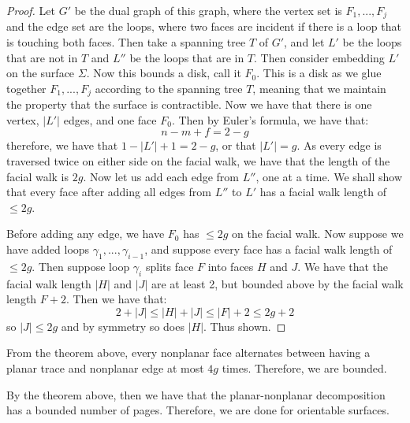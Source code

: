 \begin{proof}
	Let $G'$ be the dual graph of this graph, where the vertex set is $F_1, ..., F_j$ and the edge set are the loops, where two faces are incident if there is a loop that is touching both faces. Then take a spanning tree $T$ of $G'$, and let $L'$ be the loops that are not in $T$ and $L''$ be the loops that are in $T$. 
	Then consider embedding $L'$ on the surface $\Sigma$. Now this bounds a disk, call it $F_0$. This is a disk as we glue together $F_1, ..., F_j$ according to the spanning tree $T$, meaning that we maintain the property that the surface is contractible.
	Now we have that there is one vertex, $|L'|$ edges, and one face $F_0$. Then by Euler's formula, we have that:
	\begin{equation}
		n - m + f = 2 - g
	\end{equation}
	therefore, we have that $1 - |L'| + 1 = 2 - g$, or that $|L'| = g$. As every edge is traversed twice on either side on the facial walk, we have that the length of the facial walk is $2g$. 
	Now let us add each edge from $L''$, one at a time. We shall show that every face after adding all edges from $L''$ to $L'$ has a facial walk length of $\leq 2g$. 
	
	Before adding any edge, we have $F_0$ has $\leq 2g$ on the facial walk. Now suppose we have added loops $\gamma_1, ..., \gamma_{i - 1}$, and suppose every face has a facial walk length of $\leq 2g$. 
	Then suppose loop $\gamma_i$ splits face $F$ into faces $H$ and $J$. We have that the facial walk length $|H|$ and $|J|$ are at least 2, but bounded above by the facial walk length $F + 2$. Then we have that: 
	\begin{equation}
		2 + |J| \leq |H| + |J| \leq |F| + 2 \leq 2g + 2
	\end{equation}
	so $|J| \leq 2g$ and by symmetry so does $|H|$. Thus shown.
\end{proof}

\begin{corollary}
	From the theorem above, every nonplanar face alternates between having a planar trace and nonplanar edge at most $4g$ times. Therefore, we are bounded.
\end{corollary}

By the theorem above, then we have that the planar-nonplanar decomposition has a bounded number of pages. Therefore, we are done for orientable surfaces. 
